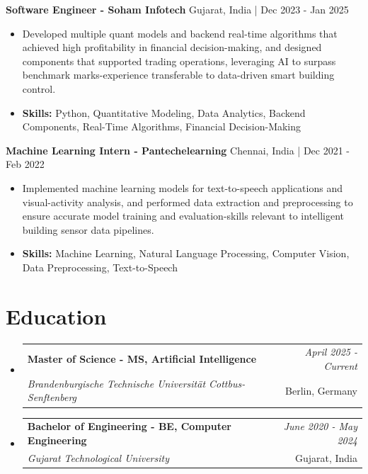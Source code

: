 \documentclass[a4paper,11pt]{article}
\makeatletter
\newcommand{\resumeSubheading}[4]{
\vspace{0.5mm}\item
    \begin{tabular*}{\linewidth}[t]{l@{\extracolsep{\fill}}r}
        \textbf{#1} & \textit{\footnotesize{#4}} \\
        \textit{\footnotesize{#3}} &  \footnotesize{#2}\\
    \end{tabular*}
    \vspace{-2.4mm}
}
\makeatother
\begin{document}
\vspace{1mm}
  \textbf{Software Engineer - Soham Infotech} \hfill Gujarat, India | Dec 2023 - Jan 2025
\vspace{-1.5mm} %
\begin{itemize}
  \item Developed multiple quant models and backend real-time algorithms that achieved high profitability in financial decision-making, and designed components that supported trading operations, leveraging AI to surpass benchmark marks-experience transferable to data-driven smart building control.

\vspace{-2mm}
  \item \textbf{Skills:} Python, Quantitative Modeling, Data Analytics, Backend Components, Real-Time Algorithms, Financial Decision-Making
\end{itemize}

\vspace{1mm}
  \textbf{Machine Learning Intern - Pantechelearning} \hfill Chennai, India | Dec 2021 - Feb 2022
\vspace{-1.5mm} %
\begin{itemize}
  \item Implemented machine learning models for text-to-speech applications and visual-activity analysis, and performed data extraction and preprocessing to ensure accurate model training and evaluation-skills relevant to intelligent building sensor data pipelines.
\vspace{-2mm}
  \item \textbf{Skills:} Machine Learning, Natural Language Processing, Computer Vision, Data Preprocessing, Text-to-Speech
\end{itemize}\section{\textbf{Education}}
\vspace{-0.4mm}

\begin{itemize}[leftmargin=0.15in, label={}]
\resumeSubheading
{Master of Science - MS, Artificial Intelligence }{Berlin, Germany}
{Brandenburgische Technische Universität Cottbus-Senftenberg  }{April 2025 - Current}

\vspace{1.0mm} %
\resumeSubheading
{Bachelor of Engineering - BE, Computer Engineering  }{Gujarat, India}
{Gujarat Technological University }{June 2020 - May 2024}

\end{itemize}
\end{document}
